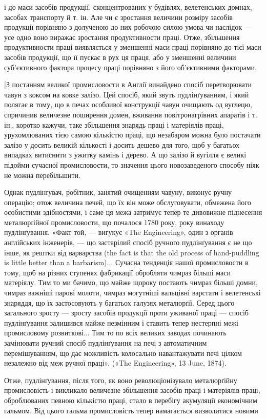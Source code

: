 \parcont{}  %
і до маси засобів продукції, сконцентрованих у будівлях, велетенських
домнах, засобах транспорту й т. ін. Але чи є зростання
величини розміру засобів продукції порівняно з долученою до
них робочою силою умова чи наслідок — усе одно воно виражає
зростання продуктивности праці. Отже, збільшення продуктивности
праці виявляється у зменшенні маси праці порівняно до
тієї маси засобів продукції, що її пускає в рух ця праця, або у
зменшенні величини суб’єктивного фактора процесу праці порівняно
з його об’єктивними факторами.

[З постанням великої промисловости в Англії винайдено
спосіб перетворювати чавун з коксом на ковке залізо. Цей
спосіб, який звуть пудлінґуванням, і який полягає в тому, що
в печах особливої конструкції чавун очищають од вуглецю,
спричинив величезне поширення домен, вживання повітронагрівних
апаратів і т. ін., коротко кажучи, таке збільшення знарядь
праці і матеріялів праці, урухомлюваних тією самою кількістю
праці, що незабаром можна було постачати залізо у досить великій
кількості і досить дешево для того, щоб у багатьох випадках
витиснити з ужитку камінь і дерево. А що залізо й вугілля є
великі підойми сучасної промисловости, то значення цього новозаведеного
способу ніяк не можна перебільшити.

Однак пудлінґувач, робітник, занятий очищенням чавуну,
виконує ручну операцію; отож величина печей, що їх він може
обслуговувати, обмежена його особистими здібностями, і саме
ця межа затримує тепер те дивовижне піднесення металюрґійної
промисловости, що почалося 1780 року, року винаходу пудлінґування.
«Факт той, — вигукує «The Engineering», один з органів
англійських інженерів, — що застарілий спосіб ручного пудлінґування
є не що інше, як рештки від варварства (the fact is that the old
process of hand-puddling is little better than a barbarism)...
Сучасна тенденція нашої промисловости в тому, щоб на різних
ступенях фабрикації обробляти чимраз більші маси матеріялу.
Тим то ми бачимо, що майже щороку постають чимраз
більші домни, чимраз важніші парові молоти, чимраз могутніші
вальцівні варстати і велетенські знаряддя, що їх застосовують
у багатьох галузях металюрґії. Серед цього загального зросту —
зросту засобів продукції проти уживаної праці — спосіб пудлінґування
залишився майже незмінним і ставить тепер нестерпні
межі промисловому розвиткові... Тим то по всіх великих заводах
починають замінювати ручний спосіб пудлінґування на
печі з автоматичним перемішуванням, що дає можливість колосально
навантажувати печі цілком незалежно від меж ручної
праці». («The Engineering», 13 June, 1874).

Отже, пудлінґування, після того, як воно революціонізувало
металюрґійну промисловість і викликало величезне збільшення
засобів праці і матеріялів праці, оброблюваних певною кількістю
праці, стало в перебігу акумуляції економічним гальмом. Від
цього гальма промисловість тепер намагається визволитися новими
\parbreak{}  %
